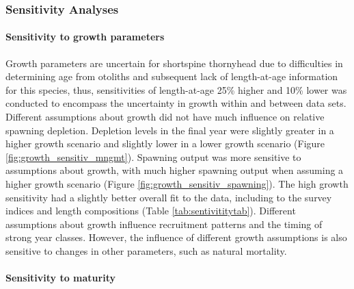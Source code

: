 \documentclass[11pt,
  english,
  letterpaper,
]{article}
\begin{document}
\hypertarget{sensitivity-analyses}{%
\subsubsection{Sensitivity Analyses}\label{sensitivity-analyses}}

\hypertarget{sensitivity-to-growth-parameters}{%
\paragraph{Sensitivity to growth parameters}\label{sensitivity-to-growth-parameters}}

Growth parameters are uncertain for shortspine thornyhead due to difficulties in determining age from otoliths and subsequent lack of length-at-age information for this species, thus, sensitivities of length-at-age 25\% higher and 10\% lower was conducted to encompass the uncertainty in growth within and between data sets. Different assumptions about growth did not have much influence on relative spawning depletion. Depletion levels in the final year were slightly greater in a higher growth scenario and slightly lower in a lower growth scenario (Figure \ref{fig:growth_sensitiv_mngmt}). Spawning output was more sensitive to assumptions about growth, with much higher spawning output when assuming a higher growth scenario (Figure \ref{fig:growth_sensitiv_spawning}). The high growth sensitivity had a slightly better overall fit to the data, including to the survey indices and length compositions (Table \ref{tab:sentivititytab}). Different assumptions about growth influence recruitment patterns and the timing of strong year classes. However, the influence of different growth assumptions is also sensitive to changes in other parameters, such as natural mortality.

\hypertarget{sensitivity-to-maturity}{%
\paragraph{Sensitivity to maturity}\label{sensitivity-to-maturity}}
\end{document}
